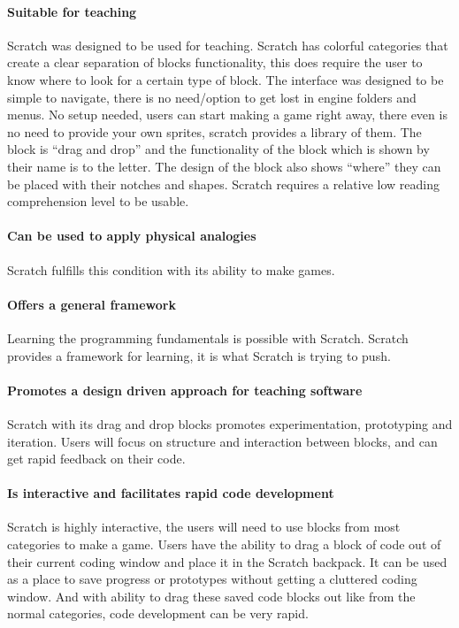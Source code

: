 \paragraph{Suitable for teaching}
Scratch was designed to be used for teaching.
Scratch has colorful categories that create a clear separation of blocks functionality, this does require the user to know where to look for a certain type of block.
The interface was designed to be simple to navigate, there is no need/option to get lost in engine folders and menus.
No setup needed, users can start making a game right away, there even is no need to provide your own sprites, scratch provides a library of them.
The block is “drag and drop” and the functionality of the block which is shown by their name is to the letter.
The design of the block also shows “where” they can be placed with their notches and shapes.
Scratch requires a relative low reading comprehension level to be usable.

\paragraph{Can be used to apply physical analogies}
Scratch fulfills this condition with its ability to make games.

\paragraph{Offers a general framework}
Learning the programming fundamentals is possible with Scratch.
Scratch provides a framework for learning, it is what Scratch is trying to push.

\paragraph{Promotes a design driven approach for teaching software}
Scratch with its drag and drop blocks promotes experimentation, prototyping and iteration.
Users will focus on structure and interaction between blocks, and can get rapid feedback on their code.

\paragraph{Is interactive and facilitates rapid code development}
Scratch is highly interactive, the users will need to use blocks from most categories to make a game.
Users have the ability to drag a block of code out of their current coding window and place it in the Scratch backpack.
It can be used as a place to save progress or prototypes without getting a cluttered coding window.
And with ability to drag these saved code blocks out like from the normal categories, code development can be very rapid.

